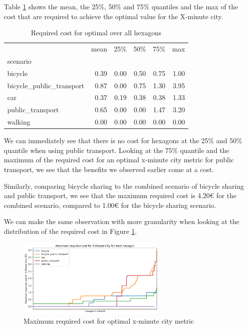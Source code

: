 Table \ref{tab:required_cost} shows the mean, the 25\%, 50\% and 75\% quantiles and the max of the cost that are required to achieve the optimal value for the X-minute city.

\begin{table}
  \caption{Required cost for optimal over all hexagons}
  \label{tab:required_cost}
  \begin{center}
    \begin{tabular}{lrrrrr}
     & mean & 25\% & 50\% & 75\% & max \\
    scenario &  &  &  &  &  \\
    bicycle & 0.39 & 0.00 & 0.50 & 0.75 & 1.00 \\
    bicycle_public_transport & 0.87 & 0.00 & 0.75 & 1.30 & 3.95 \\
    car & 0.37 & 0.19 & 0.38 & 0.38 & 1.33 \\
    public_transport & 0.65 & 0.00 & 0.00 & 1.47 & 3.20 \\
    walking & 0.00 & 0.00 & 0.00 & 0.00 & 0.00 \\
    \end{tabular}
  \end{center}
\end{table}

We can immediately see that there is no cost for hexagons at the 25\% and 50\% quantile when using public transport.
Looking at the 75\% quantile and the maximum of the required cost for an optimal x-minute city metric for public transport, we see that the benefits we observed earlier come at a cost.

Similarly, comparing bicycle sharing to the combined scenario of bicycle sharing and public transport, we see that the maximum required cost is 4.20€ for the combined scenario, compared to 1.00€ for the bicycle sharing scenario.

We can make the same observation with more granularity when looking at the distribution of the required cost in Figure \ref{fig:maximum_required_cost_for_x_minute_city}.

\begin{figure}
  \begin{center}
    \includegraphics[width=0.65\textwidth]{Figures/results/cost/maximum_required_cost_for_x_minute_city}
  \end{center}
  \caption{Maximum required cost for optimal x-minute city metric}
  \label{fig:maximum_required_cost_for_x_minute_city}
\end{figure}

